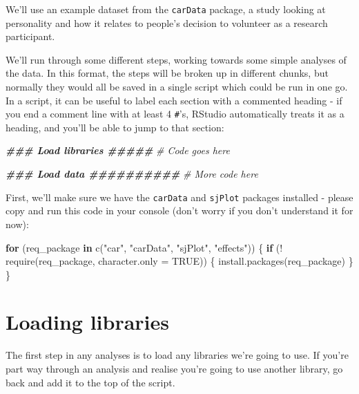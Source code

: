 \documentclass[
]{book}
\newenvironment{Shaded}{\begin{snugshade}}{\end{snugshade}}
\newcommand{\AttributeTok}[1]{\textcolor[rgb]{0.77,0.63,0.00}{#1}}
\newcommand{\CommentTok}[1]{\textcolor[rgb]{0.56,0.35,0.01}{\textit{#1}}}
\newcommand{\ConstantTok}[1]{\textcolor[rgb]{0.00,0.00,0.00}{#1}}
\newcommand{\ControlFlowTok}[1]{\textcolor[rgb]{0.13,0.29,0.53}{\textbf{#1}}}
\newcommand{\DocumentationTok}[1]{\textcolor[rgb]{0.56,0.35,0.01}{\textbf{\textit{#1}}}}
\newcommand{\FunctionTok}[1]{\textcolor[rgb]{0.00,0.00,0.00}{#1}}
\newcommand{\NormalTok}[1]{#1}
\newcommand{\SpecialCharTok}[1]{\textcolor[rgb]{0.00,0.00,0.00}{#1}}
\newcommand{\StringTok}[1]{\textcolor[rgb]{0.31,0.60,0.02}{#1}}
\begin{document}
We'll use an example dataset from the \texttt{carData} package, a study
looking at personality and how it relates to people's decision to volunteer
as a research participant.

We'll run through some different steps, working towards some simple analyses
of the data. In this format, the steps will be broken up in different chunks,
but normally they would all be saved in a single script which could
be run in one go. In a script, it can be useful to label each
section with a commented heading - if you end a comment line with at least 4 \texttt{\#}'s,
RStudio automatically treats it as a heading, and you'll be able to jump
to that section:

\begin{Shaded}
\begin{Highlighting}[]
\DocumentationTok{\#\#\# Load libraries \#\#\#\#\#}
\CommentTok{\# Code goes here}

\DocumentationTok{\#\#\# Load data \#\#\#\#\#\#\#\#\#\#}
\CommentTok{\# More code here}
\end{Highlighting}
\end{Shaded}

First, we'll make sure we have the \texttt{carData} and \texttt{sjPlot} packages
installed - please copy and run this code in your console (don't
worry if you don't understand it for now):

\begin{Shaded}
\begin{Highlighting}[]
\ControlFlowTok{for}\NormalTok{ (req\_package }\ControlFlowTok{in} \FunctionTok{c}\NormalTok{(}\StringTok{"car"}\NormalTok{, }\StringTok{"carData"}\NormalTok{, }\StringTok{"sjPlot"}\NormalTok{, }\StringTok{"effects"}\NormalTok{)) \{}
    \ControlFlowTok{if}\NormalTok{ (}\SpecialCharTok{!} \FunctionTok{require}\NormalTok{(req\_package, }\AttributeTok{character.only =} \ConstantTok{TRUE}\NormalTok{)) \{}
      \FunctionTok{install.packages}\NormalTok{(req\_package)}
\NormalTok{    \}}
\NormalTok{\}}
\end{Highlighting}
\end{Shaded}

\hypertarget{loading-libraries}{%
\section{Loading libraries}\label{loading-libraries}}

The first step in any analyses is to load any libraries we're going
to use. If you're part way through an analysis and realise you're going
to use another library, go back and add it to the top of the script.
\end{document}
